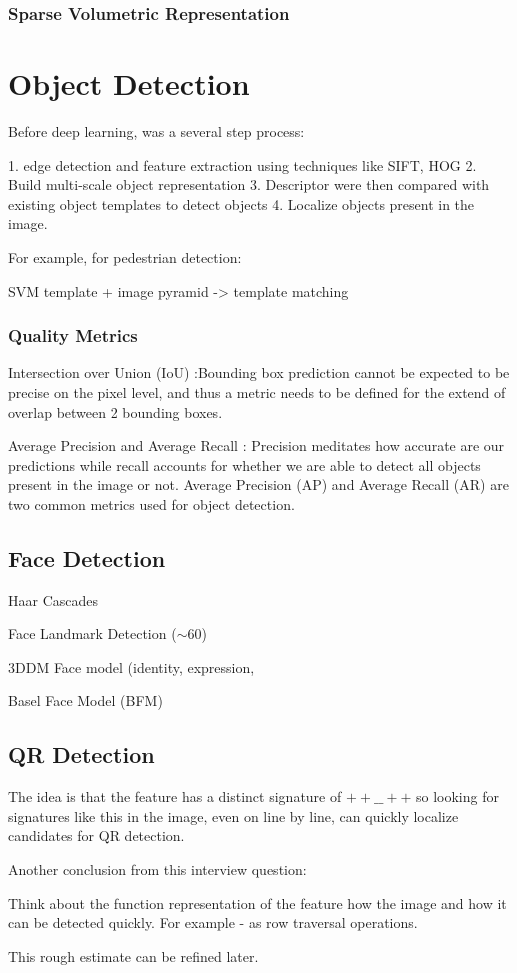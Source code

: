 \subsubsection{Sparse Volumetric Representation}


\section{Object Detection}

Before deep learning, was a several step process: 

1. edge detection and feature extraction using techniques like SIFT, HOG 
2. Build multi-scale object representation
3. Descriptor were then compared with existing object templates to detect objects
4. Localize objects present in the image.

For example, for pedestrian detection:

SVM template + image pyramid -> template matching

\subsubsection{Quality Metrics}

Intersection over Union (IoU) :Bounding box prediction cannot be expected to be precise on the pixel level, and thus a metric needs to be defined for the extend of overlap between 2 bounding boxes.

Average Precision and Average Recall : Precision meditates how accurate are our predictions while recall accounts for whether we are able to detect all objects present in the image or not. Average Precision (AP) and Average Recall (AR) are two common metrics used for object detection.

\subsection{Face Detection}

Haar Cascades

Face Landmark Detection ($\sim 60$)

3DDM Face model (identity, expression,

Basel Face Model (BFM)

\subsection{QR Detection}

The idea is that the feature has a distinct signature of $++\_\_++$ so looking for signatures like this in the image, even on line by line, can quickly localize candidates for QR detection. 

Another conclusion from this interview question: 

Think about the function representation of the feature how the image and how it can be detected quickly. For example - as row traversal operations.

This rough estimate can be refined later.


